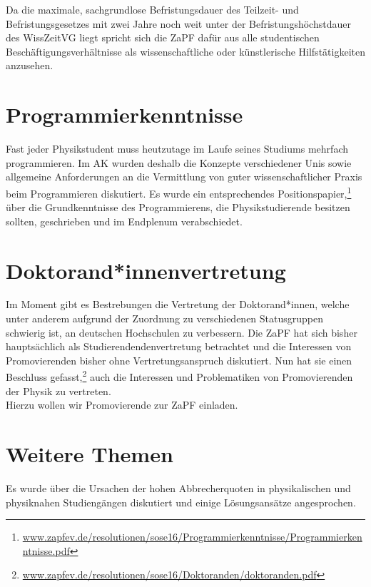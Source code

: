 Da die maximale, sachgrundlose Befristungsdauer des Teilzeit- und Befristungsgesetzes mit zwei 
Jahre noch weit unter der Befristungshöchstdauer des WissZeitVG liegt spricht sich die ZaPF 
dafür aus alle studentischen Beschäftigungsverhältnisse als wissenschaftliche oder künstlerische Hilfstätigkeiten anzusehen. \\

\section*{Programmierkenntnisse}
Fast jeder Physikstudent muss heutzutage im Laufe seines Studiums mehrfach programmieren. 
Im AK wurden deshalb die Konzepte verschiedener Unis sowie allgemeine Anforderungen an die 
Vermittlung von guter wissenschaftlicher Praxis beim Programmieren diskutiert. 
Es wurde ein entsprechendes Positionspapier,\footnote{\href{http://www.zapfev.de/resolutionen/sose16/Programmierkenntnisse/Programmierkenntnisse.pdf}{\url{www.zapfev.de/resolutionen/sose16/Programmierkenntnisse/Programmierkenntnisse.pdf}}} über die Grundkenntnisse des Programmierens, 
die Physikstudierende besitzen sollten, geschrieben und im Endplenum verabschiedet.

\section*{Doktorand*innenvertretung}
Im Moment gibt es Bestrebungen die  Vertretung der Doktorand*innen, 
welche unter anderem aufgrund der Zuordnung zu verschiedenen Statusgruppen schwierig ist, 
an deutschen Hochschulen zu verbessern. Die ZaPF hat sich bisher hauptsächlich als Studierendendenvertretung 
betrachtet und die Interessen von Promovierenden bisher ohne Vertretungsanspruch diskutiert. 
Nun hat sie einen Beschluss gefasst,\footnote{\href{http://www.zapfev.de/resolutionen/sose16/Doktoranden/doktoranden.pdf}{\url{www.zapfev.de/resolutionen/sose16/Doktoranden/doktoranden.pdf}}} auch die Interessen 
und Problematiken von Promovierenden der Physik zu vertreten. \\
Hierzu wollen wir Promovierende zur ZaPF einladen.



\section*{Weitere Themen}

Es wurde über die Ursachen der hohen Abbrecherquoten in physikalischen und 
physiknahen Studiengängen diskutiert und einige Lösungsansätze angesprochen.

